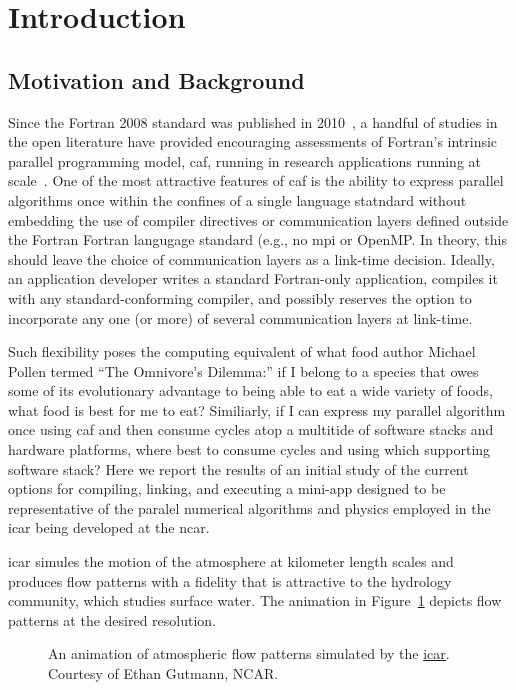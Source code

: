 \section{Introduction}
\subsection{Motivation and Background}
Since the Fortran 2008 standard was published in 2010~\cite{iso2010fortran}, a handful of studies in the open literature
have provided encouraging assessments of Fortran's intrinsic parallel programming model, \gls{caf}, running in research
applications running at scale~\cite{preissl2011multithreaded,garain2015comparing,mozdzynski2015partitioned}.   One of the
most attractive features of \gls{caf} is the ability to express parallel algorithms once within the confines of a single
language statndard without embedding the use of compiler directives or communication layers defined outside the Fortran
Fortran langugage standard (e.g., no \gls{mpi} or OpenMP.  In theory, this should leave the choice of communication layers
as a link-time decision.  Ideally, an application developer writes a standard Fortran-only application, compiles it with any
standard-conforming compiler, and possibly reserves the option to incorporate any one (or more) of several communication layers
at link-time.

Such flexibility poses the computing equivalent of what food author Michael Pollen termed ``The Omnivore's Dilemma:'' if I
belong to a species that owes some of its evolutionary advantage to being able to eat a wide variety of foods, what food is
best for me to eat?  Similiarly, if I can express my parallel algorithm once using \gls{caf} and then consume cycles atop a
multitide of software stacks and hardware platforms, where best to consume cycles and using which supporting software stack?
Here we report the results of an initial study of the current options for compiling, linking, and executing a \gls{mini-app}
designed to be representative of the paralel numerical algorithms and physics employed in the \gls{icar} being developed at
the \gls{ncar}.

\gls{icar} simules the motion of the atmosphere at kilometer length scales and produces flow patterns with a fidelity that is
attractive to the hydrology community, which studies surface water.  The animation in Figure~\ref{figure:icar} depicts flow
patterns at the desired resolution.

\begin{figure}
  \centering
   \caption{An animation of atmospheric flow patterns simulated by the \href{https://github.com/gutmann/icar}{\gls{icar}}.
      Courtesy of Ethan Gutmann, NCAR.\label{figure:icar}}
\end{figure}


